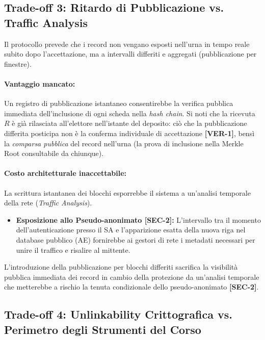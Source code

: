 \subsection{Trade-off 3: Ritardo di Pubblicazione vs. Traffic Analysis}
\label{subsec:3.4.3_tradeoff_traffic_analysis}

Il protocollo prevede che i record non vengano esposti nell'urna in tempo reale subito dopo l'accettazione, ma a intervalli differiti e aggregati (pubblicazione per finestre).

\paragraph{Vantaggio mancato:} Un registro di pubblicazione istantaneo consentirebbe la verifica pubblica immediata dell'inclusione di ogni scheda nella \textit{hash chain}. Si noti che la ricevuta $R$ è già rilasciata all'elettore nell'istante del deposito: ciò che la pubblicazione differita posticipa non è la conferma individuale di accettazione \textbf{[VER-1]}, bensì la \textit{comparsa pubblica} del record nell'urna (la prova di inclusione nella Merkle Root consultabile da chiunque).

\paragraph{Costo architetturale inaccettabile:} La scrittura istantanea dei blocchi esporrebbe il sistema a un'analisi temporale della rete (\textit{Traffic Analysis}).
\begin{itemize}
    \item \textbf{Esposizione allo Pseudo-anonimato [SEC-2]:} L'intervallo tra il momento dell'autenticazione presso il SA e l'apparizione esatta della nuova riga nel database pubblico (AE) fornirebbe ai gestori di rete i metadati necessari per unire il traffico e risalire al mittente.
\end{itemize}
L'introduzione della pubblicazione per blocchi differiti sacrifica la visibilità pubblica immediata dei record in cambio della protezione da un'analisi temporale che metterebbe a rischio la tenuta condizionale dello pseudo-anonimato \textbf{[SEC-2]}.

\subsection{Trade-off 4: Unlinkability Crittografica vs. Perimetro degli Strumenti del Corso}
\label{subsec:3.4.4_tradeoff_unlinkability}

